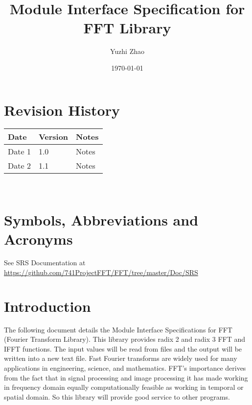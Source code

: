 \documentclass[12pt, titlepage]{article}
\begin{document}
\title{Module Interface Specification for FFT Library}

\author{Yuzhi Zhao}

\date{\today}

\maketitle


\section{Revision History}

\begin{tabularx}{\textwidth}{p{3cm}p{2cm}X}
\toprule {\bf Date} & {\bf Version} & {\bf Notes}\\
\midrule
Date 1 & 1.0 & Notes\\
Date 2 & 1.1 & Notes\\
\bottomrule
\end{tabularx}

~\newpage

\section{Symbols, Abbreviations and Acronyms}

See SRS Documentation at \url {https://github.com/741ProjectFFT/FFT/tree/master/Doc/SRS}



\newpage

\tableofcontents

\newpage


\section{Introduction}

The following document details the Module Interface Specifications for FFT (Fourier Transform Library). This library provides radix 2 and radix 3 FFT and IFFT functions. The input values will be read from files and the output will be written into a new text file. Fast Fourier transforms are widely used for many applications in engineering, science, and mathematics. FFT's importance derives from the fact that in signal processing and image processing it has made working in frequency domain equally computationally feasible as working in temporal or spatial domain. So this library will provide good service to other programs.\\
\end{document}
